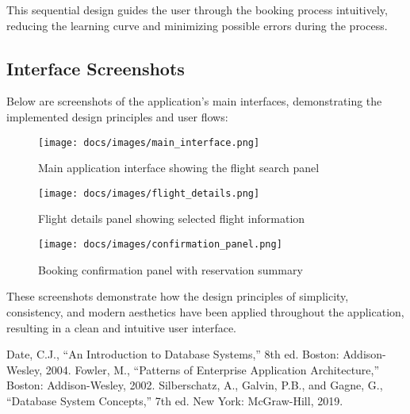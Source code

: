 \documentclass[conference]{IEEEtran}
\begin{document}
    This sequential design guides the user through the booking process intuitively, reducing the learning curve and minimizing possible errors during the process.

    \subsection{Interface Screenshots}
    Below are screenshots of the application's main interfaces, demonstrating the implemented design principles and user flows:

    \begin{figure}[H]
        \centering
        \texttt{[image: docs/images/main\_interface.png]}
        \caption{Main application interface showing the flight search panel}
        \label{fig:main_interface}
    \end{figure}

    \begin{figure}[H]
        \centering
        \texttt{[image: docs/images/flight\_details.png]}
        \caption{Flight details panel showing selected flight information}
        \label{fig:flight_details}
    \end{figure}

    \begin{figure}[H]
        \centering
        \texttt{[image: docs/images/confirmation\_panel.png]}
        \caption{Booking confirmation panel with reservation summary}
        \label{fig:confirmation_panel}
    \end{figure}

    These screenshots demonstrate how the design principles of simplicity, consistency, and modern aesthetics have been applied throughout the application, resulting in a clean and intuitive user interface.



    \begin{thebibliography}{00}
         Date, C.J., ``An Introduction to Database Systems,'' 8th ed. Boston: Addison-Wesley, 2004.
         Fowler, M., ``Patterns of Enterprise Application Architecture,'' Boston: Addison-Wesley, 2002.
         Silberschatz, A., Galvin, P.B., and Gagne, G., ``Database System Concepts,'' 7th ed. New York: McGraw-Hill, 2019.
    \end{thebibliography}
\end{document}
